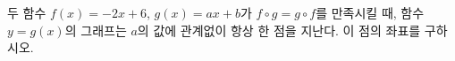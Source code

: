 두 함수 $f(x)=-2x+6$, $g(x)=ax+b$가 $f\circ g=g\circ f$를 만족시킬 때, 함수 $y=g(x)$의 그래프는 $a$의 값에 관계없이 항상 한 점을 지난다. 이 점의 좌표를 구하시오.

